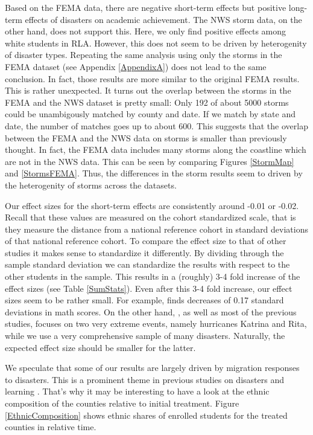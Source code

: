 Based on the FEMA data, there are negative short-term effects but positive long-term effects of disasters on academic achievement. The NWS storm data, on the other hand, does not support this. Here, we only find positive effects among white students in RLA. However, this does not seem to be driven by heterogenity of disaster types. Repeating the same analysis using only the storms in the FEMA dataset (see Appendix \ref{AppendixA}) does not lead to the same conclusion. In fact, those results are more similar to the original FEMA results. This is rather unexpected. It turns out the overlap between the storms in the FEMA and the NWS dataset is pretty small: Only 192 of about 5000 storms could be unambigously matched by county and date. If we match by state and date, the number of matches goes up to about 600. This suggests that the overlap between the FEMA and the NWS data on storms is smaller than previously thought. In fact, the FEMA data includes many storms along the coastline which are not in the NWS data. This can be seen by comparing Figures \ref{StormMap} and \ref{StormsFEMA}. Thus, the differences in the storm results seem to driven by the heterogenity of storms across the datasets.

Our effect sizes for the short-term effects are consistently around -0.01 or -0.02. Recall that these values are measured on the cohort standardized scale, that is they measure the distance from a national reference cohort in standard deviations of that national reference cohort. To compare the effect size to that of other studies it makes sense to standardize it differently. By dividing through the sample standard deviation we can standardize the results with respect to the other students in the sample. This results in a (roughly) 3-4 fold increase of the effect sizes (see Table \ref{SumStats}). Even after this 3-4 fold increase, our effect sizes seem to be rather small. For example, \cite{Sacerdote_2012} finds decreases of 0.17 standard deviations in math scores. On the other hand, \cite{Sacerdote_2012}, as well as most of the previous studies, focuses on two very extreme events, namely hurricanes Katrina and Rita, while we use a very comprehensive sample of many disasters. Naturally, the expected effect size should be smaller for the latter.

We speculate that some of our results are largely driven by migration responses to disasters. This is a prominent theme in previous studies on disasters and learning \citep{Pane_2008, Sacerdote_2012}. That's why it may be interesting to have a look at the ethnic composition of the counties relative to initial treatment. Figure \ref{EthnicComposition} shows ethnic shares of enrolled students for the treated counties in relative time.

